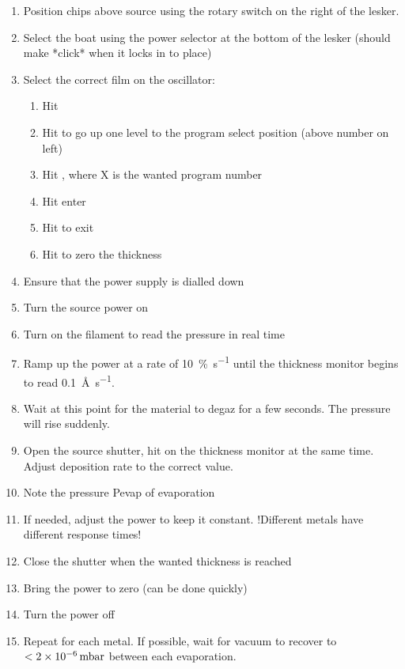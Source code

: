 \begin{enumerate}[resume]
\item Position chips above source using the rotary switch on the right of the lesker.
\item Select the boat using the power selector at the bottom of the lesker (should make *click* when it locks in to place)
\item Select the correct film on the oscillator:
\begin{enumerate}
  \item Hit 
  \item Hit  to go up one level to the program select position (above number on left)
  \item Hit , where X is the wanted program number
  \item Hit enter 
  \item Hit  to exit
  \item Hit  to zero the thickness
\end{enumerate}
\item Ensure that the power supply is dialled down
\item Turn the source power on
\item Turn on the filament to read the pressure in real time
\item Ramp up the power at a rate of \SI{10}{\percent\per\second} until the thickness monitor begins to read \SI{0.1}{\angstrom\per\second}.
\item Wait at this point for the material to degaz for a few seconds. The pressure will rise suddenly.
\item Open the source shutter, hit  on the thickness monitor at the same time. Adjust deposition rate to the correct value. 
\item Note the pressure Pevap of evaporation
\item If needed, adjust the power to keep it constant. !Different metals have different response times! 
\item Close the shutter when the wanted thickness is reached
\item Bring the power to zero (can be done quickly)
\item Turn the power off
\item Repeat for each metal. If possible, wait for vacuum to recover to $< \SI{2d-6}{\milli\bar}$ between each evaporation.
\end{enumerate}
